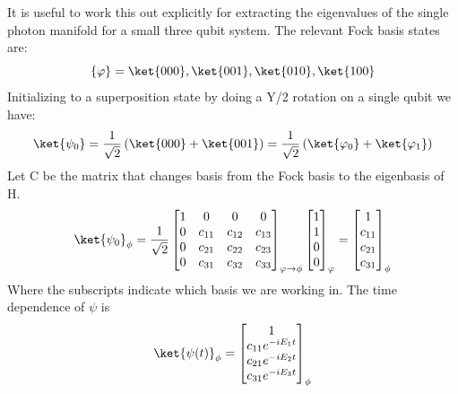 It is useful to work this out explicitly for extracting the eigenvalues of the single photon manifold for a small three qubit system.  %
The relevant Fock basis states are:
\begin{equation}
    \{\varphi\} = \ket{000}, \ket{001}, \ket{010}, \ket{100}
\end{equation}
Initializing to a superposition state by doing a Y/2 rotation on a single qubit we have:
\begin{equation*}
    \ket{\psi_0} = \frac{1}{\sqrt{2}} \left( \ket{000} + \ket{001} \right) = \frac{1}{\sqrt{2}} \left( \ket{\varphi_0} + \ket{\varphi_1} \right)
\end{equation*}
Let C be the matrix that changes basis from the Fock basis to the eigenbasis of H.
\begin{equation}
    \ket{\psi_0}_{\phi} = \frac{1}{\sqrt{2}}
    \begin{bmatrix}
        1 & 0 & 0 & 0 \\
        0 & c_{11} & c_{12} & c_{13} \\
        0 & c_{21} & c_{22} & c_{23} \\
        0 & c_{31} & c_{32} & c_{33} \\
    \end{bmatrix}_{\varphi \rightarrow \phi}
    \begin{bmatrix}
        1 \\
        1 \\
        0 \\
        0 \\
    \end{bmatrix}_{\varphi}
    =
    \begin{bmatrix}
        1 \\
        c_{11} \\
        c_{21} \\
        c_{31} \\
    \end{bmatrix}_{\phi}
\end{equation}
Where the subscripts indicate which basis we are working in.
The time dependence of $\psi$ is
\begin{equation}
    \ket{\psi(t)}_{\phi} =
    \begin{bmatrix}
        1 \\
        c_{11} e^{-i E_1 t} \\
        c_{21} e^{-i E_2 t} \\
        c_{31} e^{-i E_3 t}\\
    \end{bmatrix}_{\phi}
\end{equation}

